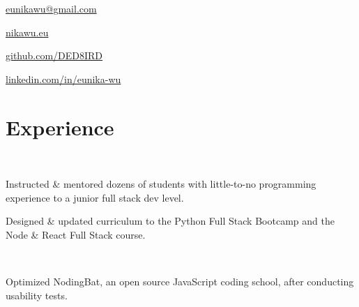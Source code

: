 \documentclass[]{hieudo-build}
\begin{document}
{
	\ci{\faEnvelope} \href{mailto:eunikawu@gmail.com}{ eunikawu@gmail.com } 
	\par
    \ci{\faGlobe} \href{https://nikawu.eu}{ nikawu.eu } \par
	\ci{\faGithub} \href{https://github.com/DED8IRD}{ github.com/DED8IRD } 
	\par
	\ci{\faLinkedinSquare} \href{https://www.linkedin.com/in/eunika-wu/}{ linkedin.com/in/eunika-wu }
	\par
}

%
%
\begin{minipage}[t]{0.63\textwidth} 

\section{Experience}

 \\
\vspace{\topsep}
\begin{tightemize}
\item Instructed \& mentored dozens of students with little-to-no programming experience to a junior full stack dev level. \\
\item Designed \& updated curriculum to the Python Full Stack Bootcamp and the Node \& React Full Stack course. \\
\smallskip
{}
{}
\end{tightemize}
\sectionsep

 \\
\begin{tightemize}
\item Optimized NodingBat, an open source JavaScript coding school, after conducting usability tests. \\
\smallskip
{}
\end{tightemize}
\sectionsep


\end{minipage}
\end{document}

